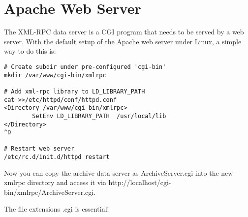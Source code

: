 \section{Apache Web Server}
The XML-RPC data server is a CGI program that needs to be served by a
web server. With the default setup of the Apache web server under
Linux, a simple way to do this is:

\begin{lstlisting}
# Create subdir under pre-configured 'cgi-bin'
mkdir /var/www/cgi-bin/xmlrpc

# Add xml-rpc library to LD_LIBRARY_PATH
cat >>/etc/httpd/conf/httpd.conf
<Directory /var/www/cgi-bin/xmlrpc>
        SetEnv LD_LIBRARY_PATH  /usr/local/lib
</Directory>
^D

# Restart web server
/etc/rc.d/init.d/httpd restart
\end{lstlisting}


\noindent Now you can copy the archive data server as
ArchiveServer.cgi into the new xmlrpc directory and access it via
http://localhost/cgi-bin/xmlrpc/ArchiveServer.cgi.

\NOTE The file extensions .cgi is essential!


